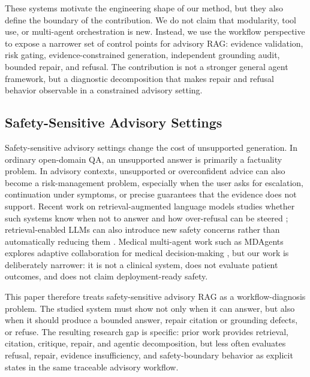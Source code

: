 These systems motivate the engineering shape of our method, but they also define the boundary of the contribution. We do not claim that modularity, tool use, or multi-agent orchestration is new. Instead, we use the workflow perspective to expose a narrower set of control points for advisory RAG: evidence validation, risk gating, evidence-constrained generation, independent grounding audit, bounded repair, and refusal. The contribution is not a stronger general agent framework, but a diagnostic decomposition that makes repair and refusal behavior observable in a constrained advisory setting.

\subsection{Safety-Sensitive Advisory Settings}

Safety-sensitive advisory settings change the cost of unsupported generation. In ordinary open-domain QA, an unsupported answer is primarily a factuality problem. In advisory contexts, unsupported or overconfident advice can also become a risk-management problem, especially when the user asks for escalation, continuation under symptoms, or precise guarantees that the evidence does not support. Recent work on retrieval-augmented language models studies whether such systems know when not to answer and how over-refusal can be steered \cite{zhou2025ralmknow,maskey2025overrefusal}; retrieval-enabled LLMs can also introduce new safety concerns rather than automatically reducing them \cite{yu2025safetydegradation}. Medical multi-agent work such as MDAgents explores adaptive collaboration for medical decision-making \cite{kim2024mdagents}, but our work is deliberately narrower: it is not a clinical system, does not evaluate patient outcomes, and does not claim deployment-ready safety.

This paper therefore treats safety-sensitive advisory RAG as a workflow-diagnosis problem. The studied system must show not only when it can answer, but also when it should produce a bounded answer, repair citation or grounding defects, or refuse. The resulting research gap is specific: prior work provides retrieval, citation, critique, repair, and agentic decomposition, but less often evaluates refusal, repair, evidence insufficiency, and safety-boundary behavior as explicit states in the same traceable advisory workflow.
